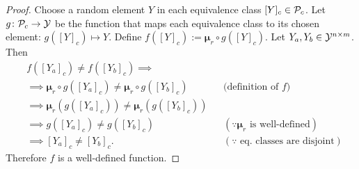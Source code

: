 \begin{appendices}
\begin{proof}
Choose a random element $Y$ in each equivalence class $[Y]_{c} \in \mathcal{P}_c$.
Let $g\colon \mathcal{P}_c \to \mathcal{Y}$ be the function that maps each equivalence class to its chosen element: $g([Y]_c) \mapsto Y$.
Define $f([Y]_c):=\pmb{\mu}_r\circ g([Y]_c)$. Let $Y_a, Y_b\in \mathcal{Y}^{n \times m}$. Then
%
\begin{align*}
    &f([Y_a]_c)\neq f([Y_b]_c) \implies&&\\
    &\implies \pmb{\mu}_r\circ g([Y_a]_c) \neq \pmb{\mu}_r\circ g([Y_b]_c) &&\text{(definition of $f$)}\\
    &\implies \pmb{\mu}_r(g([Y_a]_c)) \neq \pmb{\mu}_r(g([Y_b]_c)) \\
    &\implies g([Y_a]_c) \neq g([Y_b]_c) && (\because \pmb{\mu}_r\text{ is well-defined})\\
    &\implies [Y_a]_c \neq [Y_b]_c. && (\because\text{ eq. classes are disjoint})
\end{align*}
%
Therefore $f$ is a well-defined function.
\end{proof}



\end{appendices}

